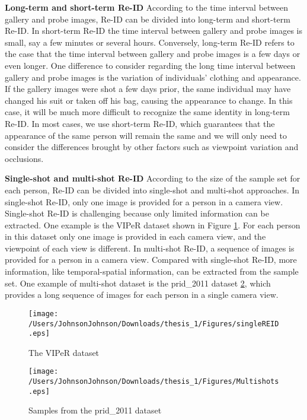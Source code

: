 \textbf{Long-term and short-term Re-ID} According to the time interval between gallery and probe images, Re-ID can be divided into long-term and short-term Re-ID.  In short-term Re-ID the time interval between gallery and probe images is small, say a few minutes or several hours. Conversely, long-term Re-ID refers to the case that the time interval between gallery and probe images is a few days or even longer. One difference to consider regarding the long time interval between gallery and probe images is the variation of individuals' clothing and appearance. If the gallery images were shot a few days prior, the same individual may have changed his suit or taken off his bag, causing the appearance to change. In this case, it will be much more difficult to recognize the same identity in long-term Re-ID. In most cases, we use short-term Re-ID, which guarantees that the appearance of the same person will remain the same and we will only need to consider the differences brought by other factors such as viewpoint variation and occlusions.


\textbf{Single-shot and multi-shot Re-ID} According to the size of the sample set for each person, Re-ID can be divided into single-shot and multi-shot approaches. In single-shot Re-ID, only one image is provided for a person in a camera view. Single-shot Re-ID is challenging because only limited information can be extracted. One example is the VIPeR dataset shown in Figure \ref{VIPeRimages}. For each person in this dataset only one image is provided in each camera view, and the viewpoint of each view is different. In multi-shot Re-ID, a sequence of images is provided for a person in a camera view. Compared with single-shot Re-ID, more information, like temporal-spatial information, can be extracted from the sample set. One example of multi-shot dataset is the prid\_2011 dataset \ref{PRID2011images}, which provides a long sequence of images for each person in a single camera view.

\begin{figure}[H]

\texttt{[image: /Users/JohnsonJohnson/Downloads/thesis\_1/Figures/singleREID.eps]}
\vspace{-3em}
\caption{The VIPeR dataset}
\label{VIPeRimages}
\end{figure}


\begin{figure}[H]

\texttt{[image: /Users/JohnsonJohnson/Downloads/thesis\_1/Figures/Multishots.eps]}
\vspace{-3em}
\caption{Samples from the prid\_2011 dataset}
\label{PRID2011images}
\end{figure}


